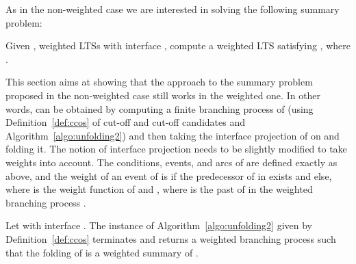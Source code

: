 \documentclass{llncs}
\begin{document}
As in the non-weighted case we are interested in solving the following summary problem:
\begin{definition}
Given , weighted LTSs with interface , compute a weighted LTS  satisfying , where .
\end{definition}

This section aims at showing that the approach to the summary problem proposed in the non-weighted case still works in the weighted one.
In other words,  can be obtained by computing a finite branching process  of  (using Definition~\ref{def:ccos} of cut-off and cut-off candidates and Algorithm~\ref{algo:unfolding2}) and then taking the interface projection  of  on  and folding it.
The notion of interface projection needs to be slightly modified to take weights into account.
The conditions, events, and arcs of  are defined exactly as above, and the weight of an event  of  is  if the predecessor  of  in  exists and  else, where  is the weight function of  and , where  is the past of  in the weighted branching process .

\begin{theorem}
\label{thm:costs}
Let  with interface .
The instance of Algorithm~\ref{algo:unfolding2} given by Definition~\ref{def:ccos} terminates and returns a weighted branching process  such that the folding  of  is a weighted summary of . 
\end{theorem}
\end{document}
